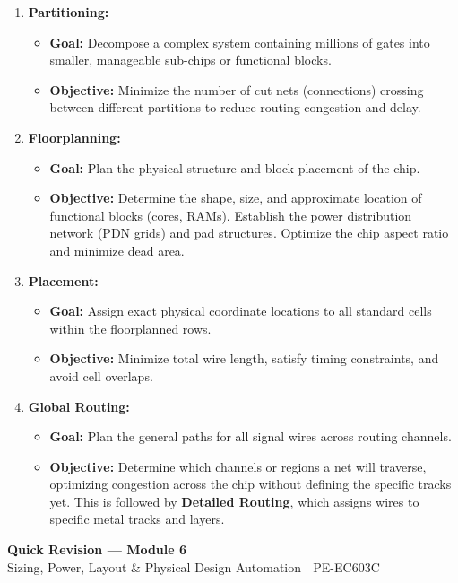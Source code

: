 \documentclass[12pt,a4paper]{article}
\begin{document}
\begin{enumerate}[label=\arabic*., leftmargin=*]
  \item \textbf{Partitioning:}
    \begin{itemize}
      \item \textbf{Goal:} Decompose a complex system containing millions of gates into smaller, manageable sub-chips or functional blocks.
      \item \textbf{Objective:} Minimize the number of cut nets (connections) crossing between different partitions to reduce routing congestion and delay.
    \end{itemize}
  \item \textbf{Floorplanning:}
    \begin{itemize}
      \item \textbf{Goal:} Plan the physical structure and block placement of the chip.
      \item \textbf{Objective:} Determine the shape, size, and approximate location of functional blocks (cores, RAMs). Establish the power distribution network (PDN grids) and pad structures. Optimize the chip aspect ratio and minimize dead area.
    \end{itemize}
  \item \textbf{Placement:}
    \begin{itemize}
      \item \textbf{Goal:} Assign exact physical coordinate locations to all standard cells within the floorplanned rows.
      \item \textbf{Objective:} Minimize total wire length, satisfy timing constraints, and avoid cell overlaps.
    \end{itemize}
  \item \textbf{Global Routing:}
    \begin{itemize}
      \item \textbf{Goal:} Plan the general paths for all signal wires across routing channels.
      \item \textbf{Objective:} Determine which channels or regions a net will traverse, optimizing congestion across the chip without defining the specific tracks yet. This is followed by \textbf{Detailed Routing}, which assigns wires to specific metal tracks and layers.
    \end{itemize}
\end{enumerate}

\newpage
\begin{center}
  {\large\bfseries\color{myred} Quick Revision --- Module 6}\\[3pt]
  {\small\color{mydark} Sizing, Power, Layout \& Physical Design Automation $|$ PE-EC603C}
\end{center}
\noindent{\color{myred}\rule{\linewidth}{1.2pt}}
\vspace{4pt}
\end{document}
